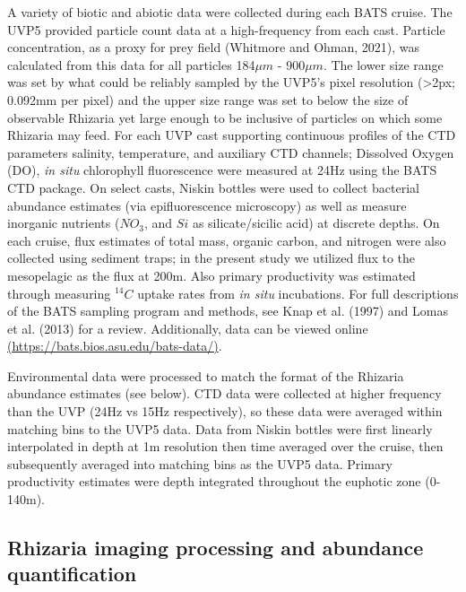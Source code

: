 \documentclass[
]{article}
\begin{document}
A variety of biotic and abiotic data were collected during each BATS
cruise. The UVP5 provided particle count data at a high-frequency from
each cast. Particle concentration, as a proxy for prey field (Whitmore
and Ohman, 2021), was calculated from this data for all particles
184\(\mu m\) - 900\(\mu m\). The lower size range was set by what could
be reliably sampled by the UVP5's pixel resolution (\textgreater2px;
0.092mm per pixel) and the upper size range was set to below the size of
observable Rhizaria yet large enough to be inclusive of particles on
which some Rhizaria may feed. For each UVP cast supporting continuous
profiles of the CTD parameters salinity, temperature, and auxiliary CTD
channels; Dissolved Oxygen (DO), \emph{in situ} chlorophyll fluorescence
were measured at 24Hz using the BATS CTD package. On select casts,
Niskin bottles were used to collect bacterial abundance estimates (via
epifluorescence microscopy) as well as measure inorganic nutrients
(\(NO_3\), and \(Si\) as silicate/sicilic acid) at discrete depths. On
each cruise, flux estimates of total mass, organic carbon, and nitrogen
were also collected using sediment traps; in the present study we
utilized flux to the mesopelagic as the flux at 200m. Also primary
productivity was estimated through measuring \(^{14}C\) uptake rates
from \emph{in situ} incubations. For full descriptions of the BATS
sampling program and methods, see Knap et al. (1997) and Lomas et al.
(2013) for a review. Additionally, data can be viewed online
\href{https://bats.bios.asu.edu/bats-data/}{(https://bats.bios.asu.edu/bats-data/)}.

Environmental data were processed to match the format of the Rhizaria
abundance estimates (see below). CTD data were collected at higher
frequency than the UVP (24Hz vs 15Hz respectively), so these data were
averaged within matching bins to the UVP5 data. Data from Niskin bottles
were first linearly interpolated in depth at 1m resolution then time
averaged over the cruise, then subsequently averaged into matching bins
as the UVP5 data. Primary productivity estimates were depth integrated
throughout the euphotic zone (0-140m).

\subsection{Rhizaria imaging processing and abundance
quantification}\label{rhizaria-imaging-processing-and-abundance-quantification}
\end{document}
